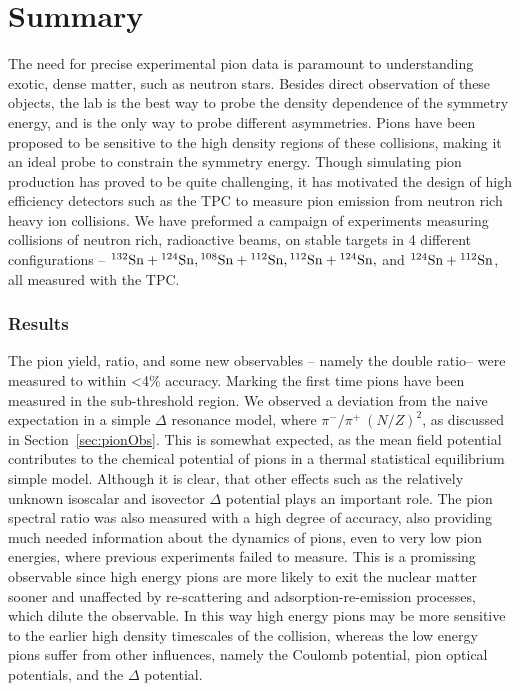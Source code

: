 \chapter{Summary}
The need for precise experimental pion data is paramount to understanding exotic, dense matter, such as neutron stars. Besides direct observation of these objects, the lab is the best way to probe the density dependence of the symmetry energy, and is the only way to probe different asymmetries. Pions have been proposed to be sensitive to the high density regions of these collisions, making it an ideal probe to constrain the symmetry energy. Though simulating pion production has proved to be quite challenging, it has motivated the design of high efficiency detectors such as the \spirit TPC to measure pion emission from neutron rich heavy ion collisions. We have preformed a campaign of experiments measuring collisions of neutron rich, radioactive beams, on stable targets in 4 different configurations -- ${}^{132}\mathrm{Sn} + {}^{124}\mathrm{Sn}, {}^{108}\mathrm{Sn} + {}^{112}\mathrm{Sn}, {}^{112}\mathrm{Sn} + {}^{124}\mathrm{Sn},$ and ${}^{124}\mathrm{Sn} + {}^{112}\mathrm{Sn}$, all measured with the \spirit TPC. 

\subsection{Results}
The pion yield, ratio, and some new observables -- namely the double ratio-- were measured to within <4\% accuracy. Marking the first time pions have been measured in the sub-threshold region. We observed a deviation from the  naive expectation in a simple $\Delta$ resonance model, where $\pi^-/\pi^+ ~ (N/Z)^2$, as discussed in Section~\ref{sec:pionObs}. This is somewhat expected, as the mean field potential contributes to the chemical potential of pions in a thermal statistical equilibrium simple model. Although it is clear, that other effects such as the relatively unknown isoscalar and isovector $\Delta$ potential plays an important role. The pion spectral ratio was also measured with a high degree of accuracy, also providing much needed information about the dynamics of pions, even to very low pion energies, where previous experiments failed to measure. This is a promissing observable since high energy pions are more likely to exit the nuclear matter sooner and unaffected by re-scattering and adsorption-re-emission processes, which dilute the observable. In this way high energy pions may be more sensitive to the earlier high density timescales of the collision, whereas the low energy pions suffer from other influences, namely the Coulomb potential, pion optical potentials, and the $\Delta$ potential. 

